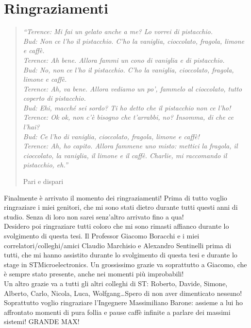 \chapter*{Ringraziamenti}


\begin{quotation}
	{\footnotesize
		\noindent\emph{``Terence: Mi fai un gelato anche a me? Lo vorrei di pistacchio. \\
			Bud: Non ce l'ho il pistacchio. C'ho la vaniglia, cioccolato, fragola, limone e caff\`e. \\
			Terence: Ah bene. Allora fammi un cono di vaniglia e di pistacchio. \\
			Bud: No, non ce l'ho il pistacchio. C'ho la vaniglia, cioccolato, fragola, limone e caff\`e. \\
			Terence: Ah, va bene. Allora vediamo un po', fammelo al cioccolato, tutto coperto di pistacchio. \\
			Bud: Ehi, macch\'e sei sordo? Ti ho detto che il pistacchio non ce l'ho! \\
			Terence: Ok ok, non c'\`e bisogno che t'arrabbi, no? Insomma, di che ce l'hai? \\
			Bud: Ce l'ho di vaniglia, cioccolato, fragola, limone e caff\`e! \\
			Terence: Ah, ho capito. Allora fammene uno misto: mettici la fragola, il cioccolato, la vaniglia, il limone e il caff\`e. Charlie, mi raccomando il pistacchio, eh.''}
		\begin{flushright}
			Pari e dispari
		\end{flushright}
	}
\end{quotation}
\vspace{0.5cm}

Finalmente \`e arrivato il momento dei ringraziamenti!
Prima di tutto voglio ringraziare i miei genitori, che mi sono stati dietro durante tutti questi anni di studio.
Senza di loro non sarei senz'altro arrivato fino a qua!\\

Desidero poi ringraziare tutti coloro che mi sono rimasti affianco durante lo svolgimento di questa tesi. 
Il Professor Giacomo Boracchi e i miei correlatori/colleghi/amici Claudio Marchisio e Alexandro Sentinelli prima di tutti, che mi hanno assistito durante lo svolgimento di questa tesi e durante lo stage in STMicroelectronics.
Un grossissimo grazie va soprattutto a Giacomo, che \`e sempre stato presente, anche nei momenti pi\`u improbabili!\\
Un altro grazie va a tutti gli altri colleghi di ST: Roberto, Davide, Simone, Alberto, Carlo, Nicola, Luca, Wolfgang\dots Spero di non aver dimenticato nessuno!\\
Soprattutto voglio ringraziare l'Ingegnere Massimiliano Barone: assieme a lui ho affrontato momenti di pura follia e pause caff\`e infinite a parlare dei massimi sistemi!
GRANDE MAX!\\


